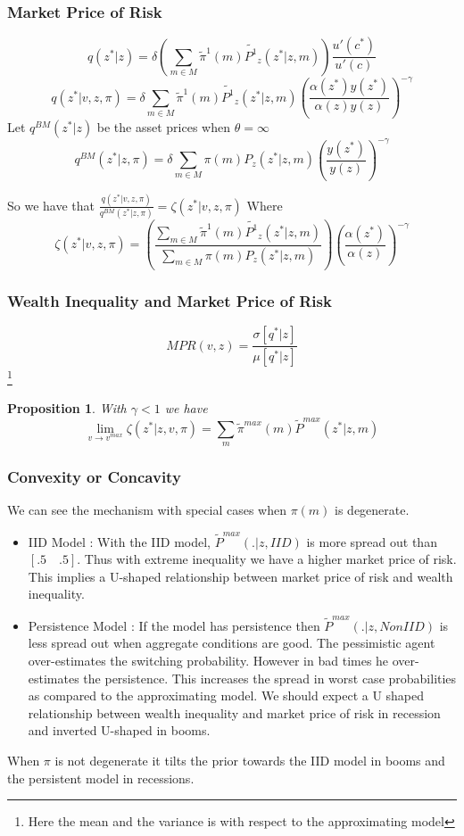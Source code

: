 \documentclass{beamer}
\newtheorem{proposition}{Proposition}
\begin{document}
\begin{frame}
\frametitle{Market Price of Risk}
\[q(z^* |z )=\delta \left(\sum_{m \in M}\tilde{\pi}^1(m)\tilde{P^1}_z(z^* |z,m)\right)\frac{ u'(c^*)}{u'(c)}\]
\[q(z^* |v,z,\pi)=\delta \sum_{m \in M}\tilde{\pi}^{1}(m)\tilde{P^1}_z(z^* |z,m)\left(\frac{\alpha(z^*)y(z^*)}{\alpha(z)y(z)}\right)^{-\gamma}\]
Let $q^{BM}(z^*|z)$ be the asset prices when $\theta=\infty$
\[q^{BM}(z^*|z,\pi) = \delta \sum_{m \in M}{\pi(m)P_{z}(z^*|z,m)} \left(\frac{y(z^*)}{y(z)}\right)^{-\gamma}\]

So we have that $\frac{q(z^*|v,z,\pi)}{q^{BM}(z^*|z,\pi)}=\zeta(z^*|v,z,\pi)$
Where 
\[\zeta(z^*|v,z,\pi)=\left(\frac{\sum_{m \in M}\tilde{\pi}^{1}(m)\tilde{P^1}_z(z^* |z,m)}{\sum_{m \in M}{\pi(m)P_{z}(z^*|z,m)}} \right)\left(\frac{\alpha(z^*)}{\alpha(z)}\right)^{-\gamma} \]

\end{frame}
\begin{frame}
\frametitle{Wealth Inequality and Market Price of Risk}
\[MPR(v,z)=\frac{\sigma[q^*|z]}{\mu[q^*|z]}\] \footnote{Here the mean and the variance is with respect to the approximating model}

\begin{proposition}
With $\gamma < 1$ we have 
\[\lim_{v\to v^{max}} \zeta(z^*|z,v,\pi) = \sum_{m}\tilde{\pi}^{max}(m)\tilde{P}^{max}(z^*|z,m)\]
\end{proposition}
\end{frame}
\begin{frame}
\frametitle{Convexity or Concavity}
We can see the mechanism with special cases when $\pi(m)$ is degenerate. 
\begin{itemize}
	\item IID Model : With the IID model, $\tilde{P}^{max}(.|z,IID)$ is more spread out than $[.5 \quad .5]$. Thus with extreme inequality we have a higher market price of risk. This implies a U-shaped relationship between market price of risk and wealth inequality.
	
	\item Persistence Model : If the model has persistence then $\tilde{P}^{max}(.|z,NonIID)$ is less spread out when aggregate conditions are good. The pessimistic agent over-estimates the switching probability. However in bad times he over-estimates the persistence. This increases the spread in worst case probabilities as compared to the approximating model. We should expect a U shaped relationship between wealth inequality and market price of risk in recession and inverted U-shaped in booms.
\end{itemize}
When $\pi$ is not degenerate it tilts the prior towards the IID model in booms and the persistent model in recessions.
\end{frame}
\end{document}

